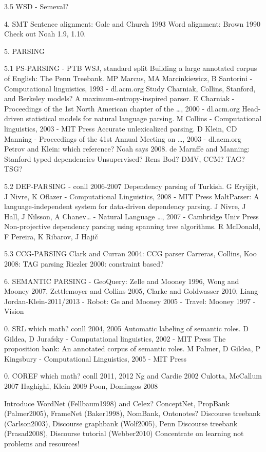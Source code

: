\documentclass[ignorenonframetext]{beamer}
\begin{document}
3.5 WSD
- Semeval?

4. SMT
Sentence alignment: Gale and Church 1993
Word alignment: Brown 1990
Check out Noah 1.9, 1.10.

5. PARSING

5.1 PS-PARSING
- PTB WSJ, standard split
Building a large annotated corpus of English: The Penn Treebank.  MP Marcus, MA Marcinkiewicz, B Santorini - Computational linguistics, 1993 - dl.acm.org
Study Charniak, Collins, Stanford, and Berkeley models?
A maximum-entropy-inspired parser. E Charniak - Proceedings of the 1st North American chapter of the …, 2000 - dl.acm.org
Head-driven statistical models for natural language parsing.  M Collins - Computational linguistics, 2003 - MIT Press
Accurate unlexicalized parsing.  D Klein, CD Manning - Proceedings of the 41st Annual Meeting on …, 2003 - dl.acm.org
Petrov and Klein: which reference?  Noah says 2008.
de Marnffe and Manning: Stanford typed dependencies
Unsupervised?  Rens Bod?  DMV, CCM?
TAG?  TSG?

5.2 DEP-PARSING
- conll 2006-2007
Dependency parsing of Turkish. G Eryiğit, J Nivre, K Oflazer - Computational Linguistics, 2008 - MIT Press
MaltParser: A language-independent system for data-driven dependency parsing.  J Nivre, J Hall, J Nilsson, A Chanev… - Natural Language …, 2007 - Cambridge Univ Press
Non-projective dependency parsing using spanning tree algorithms. R McDonald, F Pereira, K Ribarov, J Hajič

5.3 CCG-PARSING
Clark and Curran 2004: CCG parser
Carreras, Collins, Koo 2008: TAG parsing
Riezler 2000: constraint based?

6. SEMANTIC PARSING
- GeoQuery: Zelle and Mooney 1996, Wong and Mooney 2007, Zettlemoyer and Collins 2005, Clarke and Goldwasser 2010, Liang-Jordan-Klein-2011/2013
- Robot: Ge and Mooney 2005
- Travel: Mooney 1997
- Vision

0. SRL
which math?
conll 2004, 2005
Automatic labeling of semantic roles.  D Gildea, D Jurafsky - Computational linguistics, 2002 - MIT Press
The proposition bank: An annotated corpus of semantic roles. M Palmer, D Gildea, P Kingsbury - Computational Linguistics, 2005 - MIT Press


0. COREF
which math?
conll 2011, 2012
Ng and Cardie 2002
Culotta, McCallum 2007
Haghighi, Klein 2009
Poon, Domingos 2008

Introduce WordNet (Fellbaum1998) and Celex?
ConceptNet, PropBank (Palmer2005), FrameNet (Baker1998), NomBank, Ontonotes?
Discourse treebank (Carlson2003), Discourse graphbank (Wolf2005), Penn Discourse treebank (Prasad2008), Discourse tutorial (Webber2010)
Concentrate on learning not problems and resources!
\end{document}
